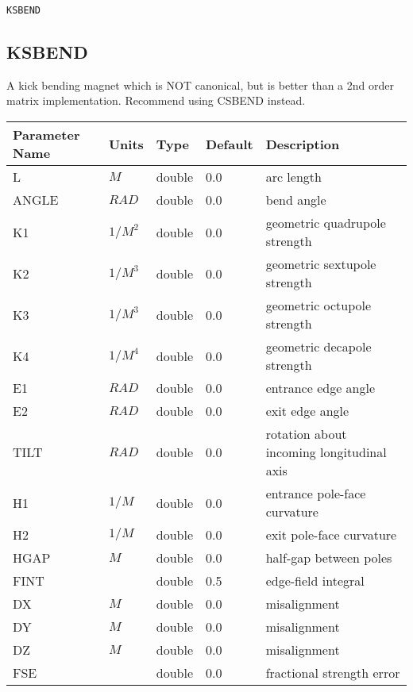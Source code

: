 \vspace*{0.5in}

\begin{latexonly}
\newpage
\begin{center}{\Large\verb|KSBEND|}\end{center}
\end{latexonly}\subsection{KSBEND}
A kick bending magnet which is NOT canonical, but is better than a 2nd order
matrix implementation.  Recommend using CSBEND instead.
\\
\begin{tabular}{|l|l|l|l|p{\descwidth}|} \hline
Parameter Name & Units & Type & Default & Description \\ \hline 
L & $M$ & double &  0.0 & arc length  \\ \hline 
ANGLE & $RAD$ & double &  0.0 & bend angle  \\ \hline 
K1 & $1/M^{2}$ & double &  0.0 & geometric quadrupole strength  \\ \hline 
K2 & $1/M^{3}$ & double &  0.0 & geometric sextupole strength  \\ \hline 
K3 & $1/M^{3}$ & double &  0.0 & geometric octupole strength  \\ \hline 
K4 & $1/M^{4}$ & double &  0.0 & geometric decapole strength  \\ \hline 
E1 & $RAD$ & double &  0.0 & entrance edge angle  \\ \hline 
E2 & $RAD$ & double &  0.0 & exit edge angle  \\ \hline 
TILT & $RAD$ & double &  0.0 & rotation about incoming longitudinal axis  \\ \hline 
H1 & $1/M$ & double &  0.0 & entrance pole-face curvature  \\ \hline 
H2 & $1/M$ & double &  0.0 & exit pole-face curvature  \\ \hline 
HGAP & $M$ & double &  0.0 & half-gap between poles  \\ \hline 
FINT &  & double &   0.5 & edge-field integral  \\ \hline 
DX & $M$ & double &  0.0 & misalignment  \\ \hline 
DY & $M$ & double &  0.0 & misalignment  \\ \hline 
DZ & $M$ & double &  0.0 & misalignment  \\ \hline 
FSE &  & double &  0.0 & fractional strength error  \\ \hline 

\end{tabular}
